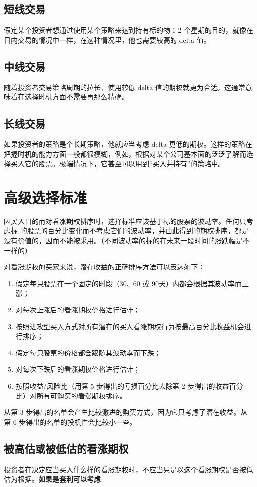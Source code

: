 \subsection*{短线交易}
假定某个投资者想通过使用某个策略来达到持有标的物 1-2 个星期的目的，就像在日内交易的情况中一样，在这种情况里，他也需要较高的 delta 值。
\subsection*{中线交易}
随着投资者交易策略周期的拉长，使用较低 delta 值的期权就更为合适。这通常意味着在选择时机方面不需要再那么精确。
\subsection*{长线交易}
如果投资者的策略是个长期策略，他就应当考虑 delta 更低的期权。这样的策略在把握时机的能力方面一般都很模糊，例如，根据对某个公司基本面的泛泛了解而选择买入它的股票。极端情况下，它甚至可以用到“买入并持有”的策略中。
\section{高级选择标准}
因买入目的而对看涨期权排序时，选择标准应该基于标的股票的波动率。任何只考虑标
的股票的百分比变化而不考虑它们的波动率，并由此得到的期权排序，都是没有价值的，因而不能被采用。（不同波动率的标的在未来一段时间的涨跌幅是不一样的）

对看涨期权的买家来说，潜在收益的正确排序方法可以表达如下：
\begin{enumerate}
    \item 假定每只股票在一个固定的时段（30、60 或 90天）内都会根据其波动率而上涨；
    \item 对每次上涨后的看涨期权价格进行估计；
    \item 按照进攻型买入方式对所有潜在的买入看涨期权行为按最高百分比收益机会进行排序；
    \item 假定每只股票的价格都会跟随其波动率而下跌；
    \item 对每次下跌后的看涨期权价格进行估计；
    \item 按照收益/风险比（用第 5 步得出的亏损百分比去除第 2 步得出的收益百分比）对所有可购买的看涨期权排序。
\end{enumerate}

从第 3 步得出的名单会产生比较激进的购买方式，因为它只考虑了潜在收益。从第 6 步得出的名单的投机性会比较小一些。
\subsection*{被高估或被低估的看涨期权}
投资者在决定应当买入什么样的看涨期权时，不应当只是以这个看涨期权是否被低估为根据。\textbf{如果是套利可以考虑}
